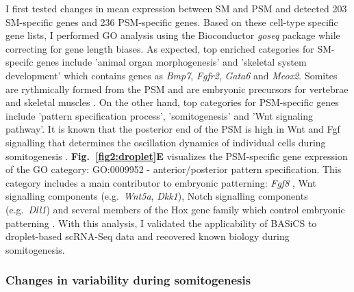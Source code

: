I first tested changes in mean expression between SM and PSM and detected 203 SM-specific genes and 236 PSM-specific genes. Based on these cell-type specific gene lists, I performed GO analysis using the Bioconductor \emph{goseq} package while correcting for gene length biases. As expected, top enriched categories for SM-specifc genes include 'animal organ morphogenesis' and 'skeletal system development' which contains genes as \textit{Bmp7}, \textit{Fgfr2}, \textit{Gata6} and \textit{Meox2}. Somites are rythmically formed from the PSM and are embryonic precursors for vertebrae and skeletal muscles \citep{Dequeant2008}. On the other hand, top categories for PSM-specific genes include 'pattern specification process', 'somitogenesis' and 'Wnt signaling pathway'. It is known that the posterior end of the PSM is high in Wnt and Fgf signalling that determines the oscillation dynamics of individual cells during somitogenesis \citep{Oates2012}. \textbf{Fig.~\ref{fig2:droplet}E} visualizes the PSM-specific gene expression of the GO category: GO:0009952 - anterior/posterior pattern specification. This category includes a main contributor to embryonic patterning: \textit{Fgf8} \citep{Dubrulle2004}, Wnt signalling components (e.g.~\textit{Wnt5a}, \textit{Dkk1}), Notch signalling components (e.g.~\textit{Dll1}) \citep{Dequeant2008} and several members of the Hox gene family which control embryonic patterning \citep{Pearson2005}. With this analysis, I validated the applicability of BASiCS to droplet-based scRNA-Seq data and recovered known biology during somitogenesis. 

\newpage

\subsubsection{Changes in variability during somitogenesis}

